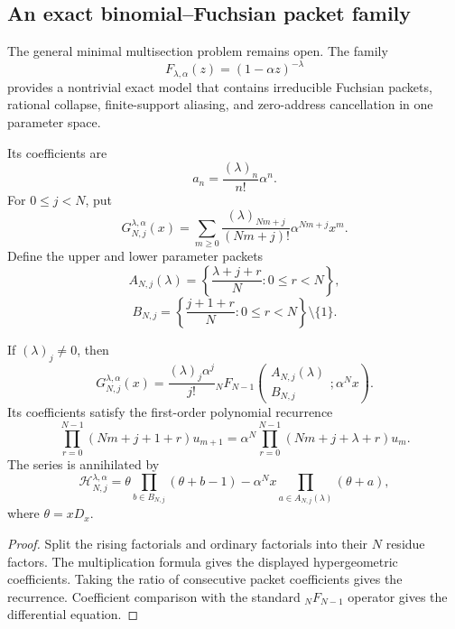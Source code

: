 \subsection{An exact binomial--Fuchsian packet family}
\label{subsec:block09-binomial-family}

The general minimal multisection problem remains open.  The family
\[
 \boxed{
 F_{\lambda,\alpha}(z)
 =
 (1-\alpha z)^{-\lambda}}
\]
provides a nontrivial exact model that contains irreducible Fuchsian packets, rational collapse, finite-support aliasing, and zero-address cancellation in one parameter space.

Its coefficients are
\[
 a_n
 =
 \frac{(\lambda)_n}{n!}\alpha^n.
\]
For $0\leq j<N$, put
\[
 G_{N,j}^{\lambda,\alpha}(x)
 =
 \sum_{m\geq0}
 \frac{(\lambda)_{Nm+j}}{(Nm+j)!}
 \alpha^{Nm+j}x^m.
\]
Define the upper and lower parameter packets
\[
 A_{N,j}(\lambda)
 =
 \left\{
 \frac{\lambda+j+r}{N}:0\leq r<N
 \right\},
\]
\[
 B_{N,j}
 =
 \left\{
 \frac{j+1+r}{N}:0\leq r<N
 \right\}\setminus\{1\}.
\]

\begin{theorem}
\label{thm:block09-hypergeom-packet}
If $(\lambda)_j\neq0$, then
\[
 \boxed{
 G_{N,j}^{\lambda,\alpha}(x)
 =
 \frac{(\lambda)_j\alpha^j}{j!}
 {}_NF_{N-1}
 \!\left(
 \begin{matrix}A_{N,j}(\lambda)\\ B_{N,j}\end{matrix}
 ;\alpha^Nx
 \right).}
\]
Its coefficients satisfy the first-order polynomial recurrence
\[
 \boxed{
 \prod_{r=0}^{N-1}(Nm+j+1+r)u_{m+1}
 =
 \alpha^N
 \prod_{r=0}^{N-1}(Nm+j+\lambda+r)u_m.}
\]
The series is annihilated by
\[
 \boxed{
 \mathcal H_{N,j}^{\lambda,\alpha}
 =
 \theta
 \prod_{b\in B_{N,j}}(\theta+b-1)
 -
 \alpha^Nx
 \prod_{a\in A_{N,j}(\lambda)}(\theta+a),}
\]
where $\theta=xD_x$.
\end{theorem}

\begin{proof}
Split the rising factorials and ordinary factorials into their $N$ residue factors.  The multiplication formula gives the displayed hypergeometric coefficients.  Taking the ratio of consecutive packet coefficients gives the recurrence.  Coefficient comparison with the standard ${}_NF_{N-1}$ operator gives the differential equation.
\end{proof}

